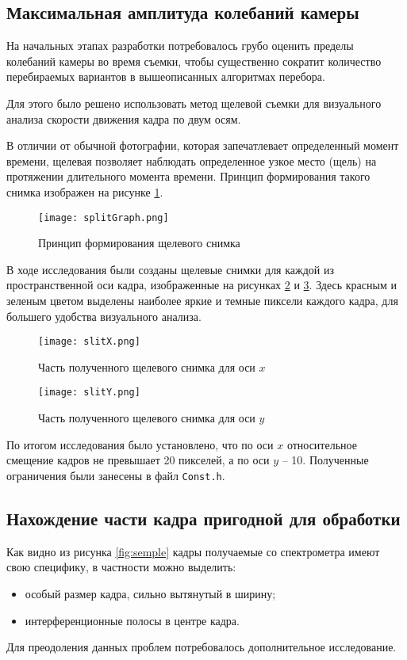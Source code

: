 \subsection{Максимальная амплитуда колебаний камеры}
На начальных этапах разработки потребовалось грубо оценить пределы колебаний камеры во время съемки, чтобы существенно сократит количество перебираемых вариантов в вышеописанных алгоритмах перебора.

Для этого было решено использовать метод щелевой съемки для визуального анализа скорости движения кадра по двум осям.

В отличии от обычной фотографии, которая запечатлевает определенный момент времени, щелевая позволяет наблюдать определенное узкое место (щель) на протяжении длительного момента времени. Принцип  формирования такого снимка изображен на рисунке \ref{fig:splitGraph}.
\begin{figure}[h]
    \centering   
    \texttt{[image: splitGraph.png]} 
    \caption{Принцип  формирования щелевого снимка}
    \label{fig:splitGraph}
\end{figure} 

В ходе исследования были созданы щелевые снимки для каждой из пространственной оси кадра, изображенные на рисунках \ref{fig:slitX} и \ref{fig:slitY}. Здесь красным и зеленым цветом выделены наиболее яркие и темные пиксели каждого кадра, для большего удобства визуального анализа.
\begin{figure}
    \centering   
    \texttt{[image: slitX.png]} 
    \caption{Часть полученного щелевого снимка для оси $x$}
    \label{fig:slitX}
\end{figure} 
\begin{figure}
    \centering   
    \texttt{[image: slitY.png]} 
    \caption{Часть полученного щелевого снимка для оси $y$}
    \label{fig:slitY}
\end{figure} 

По итогом исследования было установлено, что по оси $x$ относительное смещение кадров не превышает 20 пикселей, а по оси $y$ -- 10. Полученные ограничения были занесены в файл \texttt{Const.h}. 
\subsection{Нахождение части кадра пригодной для обработки}
Как видно из рисунка \ref{fig:semple} кадры получаемые со спектрометра имеют свою специфику, в частности можно выделить:
\begin{itemize}
	\item особый размер кадра, сильно вытянутый в ширину;
	\item интерференционные полосы в центре кадра. 
\end{itemize}
Для преодоления данных проблем потребовалось дополнительное исследование.

